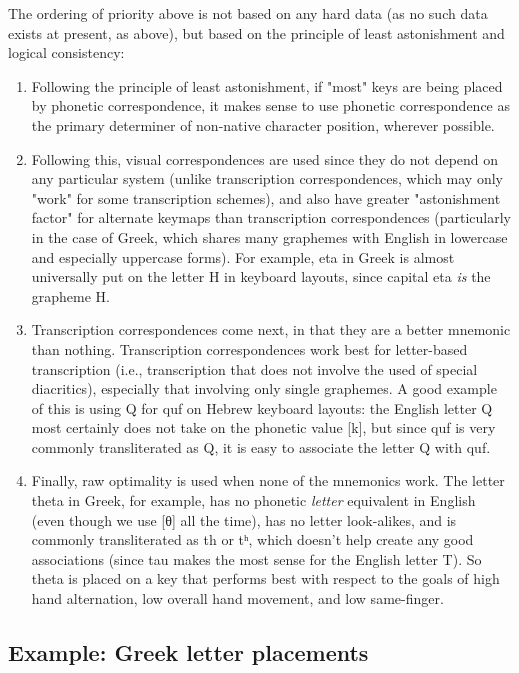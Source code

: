 \documentclass[11pt]{article}
\begin{document}
The ordering of priority above is not based on any hard data (as no such data exists at present, as above), but based on the principle of least astonishment and logical consistency:

\begin{enumerate}
\item Following the principle of least astonishment, if "most" keys are being placed by phonetic correspondence, it makes sense to use phonetic correspondence as the primary determiner of non-native character position, wherever possible.
\item Following this, visual correspondences are used since they do not depend on any particular system (unlike transcription correspondences, which may only "work" for some transcription schemes), and also have greater "astonishment factor" for alternate keymaps than transcription correspondences (particularly in the case of Greek, which shares many graphemes with English in lowercase and especially uppercase forms). For example, eta in Greek is almost universally put on the letter H in keyboard layouts, since capital eta \emph{is} the grapheme H.
\item Transcription correspondences come next, in that they are a better mnemonic than nothing. Transcription correspondences work best for letter-based transcription (i.e., transcription that does not involve the used of special diacritics), especially that involving only single graphemes. A good example of this is using Q for quf on Hebrew keyboard layouts: the English letter Q most certainly does not take on the phonetic value [k], but since quf is very commonly transliterated as Q, it is easy to associate the letter Q with quf.
\item Finally, raw optimality is used when none of the mnemonics work. The letter theta in Greek, for example, has no phonetic \emph{letter} equivalent in English (even though we use [θ] all the time), has no letter look-alikes, and is commonly transliterated as th or tʰ, which doesn't help create any good associations (since tau makes the most sense for the English letter T). So theta is placed on a key that performs best with respect to the goals of high hand alternation, low overall hand movement, and low same-finger.
\end{enumerate}

\subsection{Example: Greek letter placements}
\label{sec:org00ae414}
\end{document}
